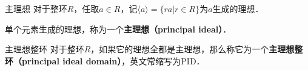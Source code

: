 

\begin{definition}{主理想}
对于整环$R$，任取$a\in R$，记$\langle a \rangle=\{ra|r\in R\}$为$a$生成的理想．

单个元素生成的理想，称为一个\textbf{主理想（principal ideal）}．
\end{definition}

\begin{definition}{主理想整环}
对于整环$R$，如果它的理想全都是主理想，那么称它为一个\textbf{主理想整环（principal ideal domain）}，英文常缩写为PID．
\end{definition}